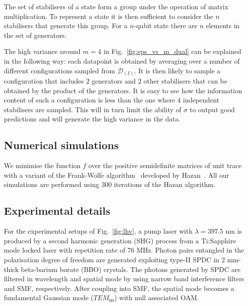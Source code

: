 \documentclass[aps,superscriptaddress,nofootinbib,twocolumn]{revtex4-1}
\begin{document}
The set of stabilisers of a state form a group under the operation of matrix multiplication. To represent a state it is then sufficient to consider the $n$ stabilisers that generate this group. For a $n$-qubit state there are $n$ elements in the set of generators. 

The high variance around $m=4$ in Fig.~\ref{fig:eps_vs_m_dual} can be explained in the following way: each datapoint is obtained by averaging over a number of different configurations sampled from $\mathcal{D}_{(I)}$. It is then likely to sample a configuration that includes $2$ generators and $2$ other stabilisers that can be obtained by the product of the generators. It is easy to see how the information content of such a configuration is less than the one where $4$ independent stabilisers are sampled. This will in turn limit the ability of $\sigma$ to output good predictions and will generate the high variance in the data.

\subsection*{Numerical simulations}

We minimise the function $f$ over the positive semidefinite matrices of unit trace with a variant of the Frank-Wolfe algorithm~\cite{frank1956algorithm} developed by Hazan~\cite{hazan2008sparse}.  All our simulations are performed using $300$ iterations of the Hazan algorithm.


\subsection*{Experimental details}\label{sec:expsetup}

For the experimental setups of Fig.~\ref{fig:lhv}, a pump laser with $\lambda=397.5$ nm is produced by a second harmonic generation (SHG) process from a Ti:Sapphire mode locked laser with repetition rate of $76$ MHz. Photon pairs entangled in the polarisation degree of freedom are generated exploiting type-II SPDC in 2 mm-thick beta-barium borate (BBO) crystals. The photons
generated by SPDC are filtered in wavelength and spatial mode by using narrow
band interference filters and SMF, respectively. After
coupling into SMF, the spatial mode becomes a fundamental Gaussian mode
($TEM_{00}$) with null associated OAM.
 
\clearpage

\appendix
\end{document}
